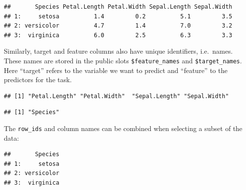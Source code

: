 \documentclass[]{scrbook}
\newenvironment{Shaded}{\begin{snugshade}}{\end{snugshade}}
\newcommand{\CommentTok}[1]{\textcolor[rgb]{0.56,0.35,0.01}{\textit{#1}}}
\newcommand{\DataTypeTok}[1]{\textcolor[rgb]{0.13,0.29,0.53}{#1}}
\newcommand{\DecValTok}[1]{\textcolor[rgb]{0.00,0.00,0.81}{#1}}
\newcommand{\KeywordTok}[1]{\textcolor[rgb]{0.13,0.29,0.53}{\textbf{#1}}}
\newcommand{\NormalTok}[1]{#1}
\newcommand{\OperatorTok}[1]{\textcolor[rgb]{0.81,0.36,0.00}{\textbf{#1}}}
\newcommand{\StringTok}[1]{\textcolor[rgb]{0.31,0.60,0.02}{#1}}
\renewenvironment{Shaded} {\begin{snugshade}\small} {\end{snugshade}}
\begin{document}
\begin{verbatim}
##       Species Petal.Length Petal.Width Sepal.Length Sepal.Width
## 1:     setosa          1.4         0.2          5.1         3.5
## 2: versicolor          4.7         1.4          7.0         3.2
## 3:  virginica          6.0         2.5          6.3         3.3
\end{verbatim}

Similarly, target and feature columns also have unique identifiers, i.e.~names.
These names are stored in the public slots \texttt{\$feature\_names} and \texttt{\$target\_names}.
Here ``target'' refers to the variable we want to predict and ``feature'' to the predictors for the task.

\begin{Shaded}
\end{Shaded}

\begin{verbatim}
## [1] "Petal.Length" "Petal.Width"  "Sepal.Length" "Sepal.Width"
\end{verbatim}

\begin{Shaded}
\end{Shaded}

\begin{verbatim}
## [1] "Species"
\end{verbatim}

The \texttt{row\_ids} and column names can be combined when selecting a subset of the data:

\begin{Shaded}
\end{Shaded}

\begin{verbatim}
##       Species
## 1:     setosa
## 2: versicolor
## 3:  virginica
\end{verbatim}
\end{document}
